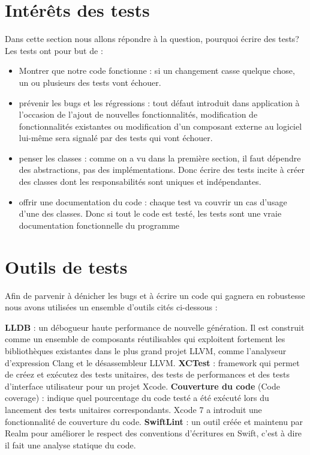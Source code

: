 \section{Intérêts des tests} %
\label{sub:pourquoi_tester_}
Dans cette section nous allons répondre à la question, pourquoi écrire des tests?\newline
Les tests ont pour but de :
\begin{itemize}
	\item Montrer que notre code fonctionne :  si un changement casse quelque chose, un ou plusieurs des tests vont échouer.
	\item prévenir les bugs et les régressions : tout défaut introduit dans application à l'occasion de l'ajout de nouvelles fonctionnalités, modification de fonctionnalités existantes ou modification d'un composant externe au logiciel lui-même sera signalé par des tests qui vont échouer.
	\item penser les classes : comme on a vu dans la première section, il faut dépendre des abstractions, pas des implémentations. Donc écrire des tests incite à créer des classes dont les responsabilités sont uniques et indépendantes.
	\item offrir une documentation du code : chaque test va couvrir un cas d'usage d'une des classes. Donc si tout le code est testé, les tests sont une vraie documentation fonctionnelle du programme
\end{itemize} 

\section{Outils de tests} %
\label{sub:outils_de_tests}
Afin de parvenir à dénicher les bugs et à écrire un code qui gagnera en robustesse nous avons utilisées un ensemble d'outils cités ci-dessous : 
\begin{itemize}
	\itemb \textbf{LLDB} : un débogueur haute performance de nouvelle génération. Il est construit comme un ensemble de composants réutilisables qui exploitent fortement les bibliothèques existantes dans le plus grand projet LLVM, comme l'analyseur d'expression Clang et le désassembleur LLVM.
	\itemb \textbf{XCTest} : framework qui permet de créez et exécutez des tests unitaires, des tests de performances et des tests d'interface utilisateur pour un projet Xcode.
	\itemb \textbf{Couverture du code} (Code coverage) : indique quel pourcentage du code testé a été exécuté lors du lancement des tests unitaires correspondants. Xcode 7 a introduit une fonctionnalité de couverture du code.
	\itemb \textbf{SwiftLint} : un outil créée et maintenu par Realm pour améliorer le respect des conventions d’écritures en Swift, c'est à dire il fait une analyse statique du code.
\end{itemize}

